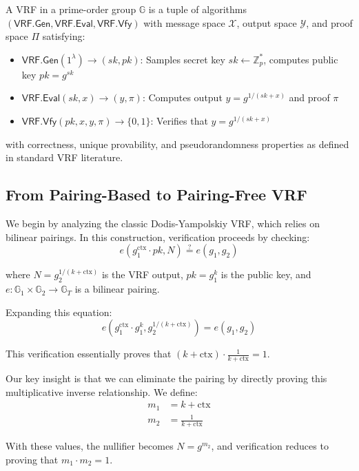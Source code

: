 \begin{definition}
A VRF in a prime-order group $\mathbb{G}$ is a tuple of algorithms $(\mathsf{VRF.Gen}, \mathsf{VRF.Eval}, \mathsf{VRF.Vfy})$ with message space $\mathcal{X}$, output space $\mathcal{Y}$, and proof space $\Pi$ satisfying:

\begin{itemize}
    \item $\mathsf{VRF.Gen}(1^\lambda) \rightarrow (sk, pk)$: Samples secret key $sk \leftarrow \mathbb{Z}_p^*$, computes public key $pk = g^{sk}$
    \item $\mathsf{VRF.Eval}(sk, x) \rightarrow (y, \pi)$: Computes output $y = g^{1/(sk+x)}$ and proof $\pi$
    \item $\mathsf{VRF.Vfy}(pk, x, y, \pi) \rightarrow \{0,1\}$: Verifies that $y = g^{1/(sk+x)}$
\end{itemize}

with correctness, unique provability, and pseudorandomness properties as defined in standard VRF literature.
\end{definition}

\subsection{From Pairing-Based to Pairing-Free VRF}

We begin by analyzing the classic Dodis-Yampolskiy VRF, which relies on bilinear pairings. In this construction, verification proceeds by checking:
\[
e(g_1^{\text{ctx}} \cdot pk, N) \stackrel{?}{=} e(g_1, g_2)
\]

where $N = g_2^{1/(k+\text{ctx})}$ is the VRF output, $pk = g_1^k$ is the public key, and $e: \mathbb{G}_1 \times \mathbb{G}_2 \rightarrow \mathbb{G}_T$ is a bilinear pairing.

Expanding this equation:
\[
e(g_1^{\text{ctx}} \cdot g_1^k, g_2^{1/(k+\text{ctx})}) = e(g_1, g_2)
\]

This verification essentially proves that $(k+\text{ctx}) \cdot \frac{1}{k+\text{ctx}} = 1$.

Our key insight is that we can eliminate the pairing by directly proving this multiplicative inverse relationship. We define:
\begin{align}
m_1 &= k + \text{ctx} \\
m_2 &= \frac{1}{k+\text{ctx}}
\end{align}

With these values, the nullifier becomes $N = g^{m_2}$, and verification reduces to proving that $m_1 \cdot m_2 = 1$.

